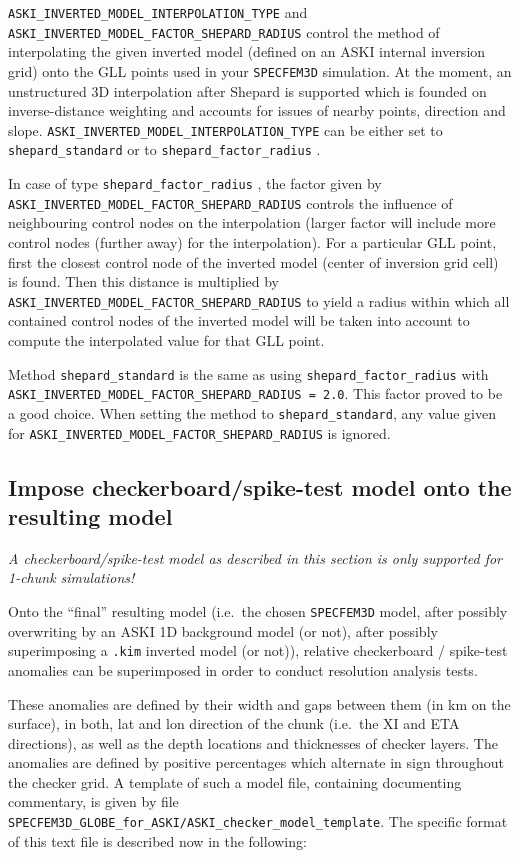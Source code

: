 \documentclass[12pt,a4paper]{article}
\newcommand{\lcode}[1]{\nolinkurl{#1}}
\newcommand{\ASKI}{ {\ttfamily ASKI} }
\begin{document}
\lcode{ASKI_INVERTED_MODEL_INTERPOLATION_TYPE} and \lcode{ASKI_INVERTED_MODEL_FACTOR_SHEPARD_RADIUS}
control the method of interpolating the given inverted model (defined on an \ASKI{} internal inversion grid) 
onto the GLL points used in your \lcode{SPECFEM3D} simulation. At the moment, an unstructured 3D 
interpolation after Shepard \cite{Shepard68} is supported  which is founded on inverse-distance weighting 
and accounts for issues of nearby points, direction and slope. 
\lcode{ASKI_INVERTED_MODEL_INTERPOLATION_TYPE}
can be either set to \lcode{shepard_standard} or to \lcode{shepard_factor_radius} .

In case of type \lcode{shepard_factor_radius} , the factor given by \lcode{ASKI_INVERTED_MODEL_FACTOR_SHEPARD_RADIUS}
controls the influence of neighbouring control nodes on the interpolation (larger factor will include more 
control nodes (further away) for the interpolation). For a particular GLL point, first the closest control node of the inverted model
(center of inversion grid cell) is found. Then this distance is multiplied by 
\lcode{ASKI_INVERTED_MODEL_FACTOR_SHEPARD_RADIUS} to yield a radius within which all contained control nodes
of the inverted model will be taken into account to compute the interpolated value for that GLL point.

Method \lcode{shepard_standard} is the same as using \lcode{shepard_factor_radius} with \lcode{ASKI_INVERTED_MODEL_FACTOR_SHEPARD_RADIUS = 2.0}.
This factor proved to be a good choice. When setting the method to \lcode{shepard_standard}, any value given for 
\lcode{ASKI_INVERTED_MODEL_FACTOR_SHEPARD_RADIUS} is ignored.

\subsection{Impose checkerboard/spike-test model onto the resulting model} \label{import_model:ssec_checker}
\emph{A checkerboard/spike-test model as described in this section is only supported for 1-chunk simulations!}

Onto the ``final'' resulting model (i.e.\ the chosen \lcode{SPECFEM3D} model, after possibly overwriting by an 
\ASKI{} 1D background model (or not), after possibly superimposing a \lcode{.kim} inverted model (or not)), 
relative checkerboard / spike-test anomalies can be superimposed in order to conduct resolution analysis tests.

These anomalies are defined by their width and gaps between them (in km on the surface), in both, lat 
and lon direction of the chunk (i.e.\ the XI and ETA directions), as well as the depth locations and thicknesses
of checker layers. The anomalies are defined by positive percentages which alternate in sign throughout the 
checker grid.
A template of such a model file, containing documenting commentary, is given by file 
\lcode{SPECFEM3D_GLOBE_for_ASKI/ASKI_checker_model_template}.
The specific format of this text file is described now in the following:
\end{document}
